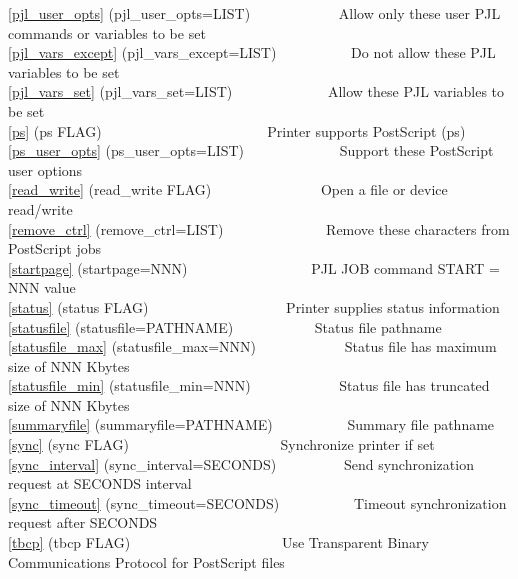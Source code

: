 \documentclass[a4paper]{article}
\begin{document}
{\ttfamily \ref{pjl_user_opts} {(pjl\_user\_opts=LIST)}}{\ttfamily ~~~~~~~~~~~~} Allow only these user PJL commands or variables to be set \\ 
{\ttfamily \ref{pjl_vars_except} {(pjl\_vars\_except=LIST)}}{\ttfamily ~~~~~~~~~~} Do not allow these PJL variables to be set \\ 
{\ttfamily \ref{pjl_vars_set} {(pjl\_vars\_set=LIST)}}{\ttfamily ~~~~~~~~~~~~~} Allow these PJL variables to be set \\ 
{\ttfamily \ref{ps} {(ps FLAG)}}{\ttfamily ~~~~~~~~~~~~~~~~~~~~~~~} Printer supports PostScript (ps) \\ 
{\ttfamily \ref{ps_user_opts} {(ps\_user\_opts=LIST)}}{\ttfamily ~~~~~~~~~~~~~} Support these PostScript user options \\ 
{\ttfamily \ref{read_write} {(read\_write FLAG)}}{\ttfamily ~~~~~~~~~~~~~~~} Open a file or device read/write\\ 
{\ttfamily \ref{remove_ctrl} {(remove\_ctrl=LIST)}}{\ttfamily ~~~~~~~~~~~~~~} Remove these characters from PostScript jobs \\ 
{\ttfamily \ref{startpage} {(startpage=NNN)}}{\ttfamily ~~~~~~~~~~~~~~~~~} PJL JOB command START = NNN value \\ 
{\ttfamily \ref{status} {(status FLAG)}}{\ttfamily ~~~~~~~~~~~~~~~~~~~} Printer supplies status information \\ 
{\ttfamily \ref{statusfile} {(statusfile=PATHNAME)}}{\ttfamily ~~~~~~~~~~~} Status file pathname \\ 
{\ttfamily \ref{statusfile_max} {(statusfile\_max=NNN)}}{\ttfamily ~~~~~~~~~~~~} Status file has maximum size of NNN Kbytes \\ 
{\ttfamily \ref{statusfile_min} {(statusfile\_min=NNN)}}{\ttfamily ~~~~~~~~~~~~} Status file has truncated size of NNN Kbytes \\ 
{\ttfamily \ref{summaryfile} {(summaryfile=PATHNAME)}}{\ttfamily ~~~~~~~~~~} Summary file pathname \\ 
{\ttfamily \ref{sync} {(sync FLAG)}}{\ttfamily ~~~~~~~~~~~~~~~~~~~~~} Synchronize printer if set \\ 
{\ttfamily \ref{sync_interval} {(sync\_interval=SECONDS)}}{\ttfamily ~~~~~~~~~} Send synchronization request at SECONDS interval \\ 
{\ttfamily \ref{sync_timeout} {(sync\_timeout=SECONDS)}}{\ttfamily ~~~~~~~~~~} Timeout synchronization request after SECONDS \\ 
{\ttfamily \ref{tbcp} {(tbcp FLAG)}}{\ttfamily ~~~~~~~~~~~~~~~~~~~~~} Use Transparent Binary Communications Protocol for PostScript files \\ 
\end{document}

